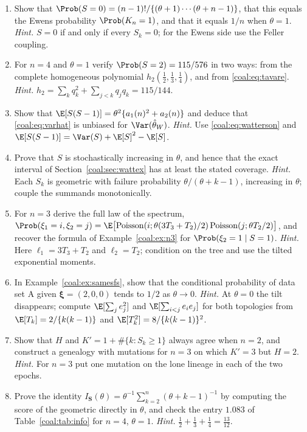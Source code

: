 \begin{enumerate}[label=\arabic*., leftmargin=*]
\item Show that $\Prob(S=0)=(n-1)!/\{(\theta+1)\cdots(\theta+n-1)\}$, that this equals the Ewens probability $\Prob(K_n=1)$, and that it equals $1/n$ when $\theta=1$.
\emph{Hint.} $S=0$ if and only if every $S_k=0$; for the Ewens side use the Feller coupling.

\item For $n=4$ and $\theta=1$ verify $\Prob(S=2)=115/576$ in two ways: from the complete homogeneous polynomial $h_2(\tfrac12,\tfrac13,\tfrac14)$, and from \eqref{coal:eq:tavare}.
\emph{Hint.} $h_2=\sum_kq_k^2+\sum_{j<k}q_jq_k=115/144$.

\item Show that $\E[S(S-1)]=\theta^2\{a_1(n)^2+a_2(n)\}$ and deduce that \eqref{coal:eq:varhat} is unbiased for $\Var(\hat\theta_W)$.
\emph{Hint.} Use \eqref{coal:eq:watterson} and $\E[S(S-1)]=\Var(S)+\E[S]^2-\E[S]$.

\item Prove that $S$ is stochastically increasing in $\theta$, and hence that the exact interval of Section~\ref{coal:sec:wattex} has at least the stated coverage.
\emph{Hint.} Each $S_k$ is geometric with failure probability $\theta/(\theta+k-1)$, increasing in $\theta$; couple the summands monotonically.

\item For $n=3$ derive the full law of the spectrum, $\Prob(\xi_1=i,\xi_2=j)=\E\bigl[\coalPois(i;\theta(3T_3+T_2)/2)\,\coalPois(j;\theta T_2/2)\bigr]$, and recover the formula of Example~\ref{coal:ex:n3} for $\Prob(\xi_2=1\mid S=1)$.
\emph{Hint.} Here $\ell_1=3T_3+T_2$ and $\ell_2=T_2$; condition on the tree and use the tilted exponential moments.

\item In Example~\ref{coal:ex:samesfs}, show that the conditional probability of data set A given $\bm\xi=(2,0,0)$ tends to $1/2$ as $\theta\to0$.
\emph{Hint.} At $\theta=0$ the tilt disappears; compute $\E[\sum_je_j^2]$ and $\E[\sum_{i<j}e_ie_j]$ for both topologies from $\E[T_k]=2/\{k(k-1)\}$ and $\E[T_k^2]=8/\{k(k-1)\}^2$.

\item Show that $H$ and $K'=1+\#\{k:S_k\ge1\}$ always agree when $n=2$, and construct a genealogy with mutations for $n=3$ on which $K'=3$ but $H=2$.
\emph{Hint.} For $n=3$ put one mutation on the lone lineage in each of the two epochs.

\item Prove the identity $I_{\bm S}(\theta)=\theta^{-1}\sum_{k=2}^n(\theta+k-1)^{-1}$ by computing the score of the geometric directly in $\theta$, and check the entry $1.083$ of Table~\ref{coal:tab:info} for $n=4$, $\theta=1$.
\emph{Hint.} $\tfrac12+\tfrac13+\tfrac14=\tfrac{13}{12}$.


\end{enumerate}
